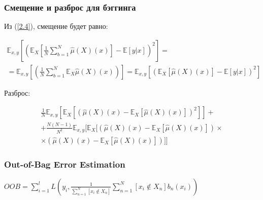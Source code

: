 \documentclass[fleqn,pdf, 9pt, usenames, dvipsnames, unicode, hyperref={bookmarks=true,bookmarksopen=false, bookmarksnumbered}]{beamer}
\begin{document}
\begin{frame}\frametitle{Смещение и разброс для бэггинга}

Из (\ref{2.4}), смещение будет равно:

\begin{multline}
	\mathbb{E}_{x,y}\left[\left(\mathbb{E}_X\left[\frac{1}{N}\sum_{b=1}^{N}\hat{\mu}(X)(x)\right]-\mathbb{E}[y|x]\right)^2\right] = \\ = \mathbb{E}_{x,y}\left[\left(\frac{1}{N}\sum_{b=1}^{N}\mathbb{E}_X\hat{\mu}(X)(x)\right)\right]  =\mathbb{E}_{x,y}\left[(\mathbb{E}_X\left[\hat{\mu}(X)(x)\right]-\mathbb{E}[y|x])^2\right]
\end{multline}

Разброс: 

\begin{multline}
	\frac{1}{N}\mathbb{E}_{x,y}\left[\mathbb{E}_X\left[\left(\hat{\mu}(X)(x)-\mathbb{E}_X[\hat{\mu}(X)(x)]\right)^2\right]\right] + \\ + 
	\frac{N(N-1)}{N^2}\mathbb{E}_{x,y}[\mathbb{E}_X[\left(\hat{\mu}(X)(x)-\mathbb{E}_X[\hat{\mu}(X)(x)]\right)\times \\ \times \left(\hat{\mu}(X)(x)-\mathbb{E}_X[\hat{\mu}(X)(x)]\right)]]
\end{multline}


\end{frame}


\begin{frame}\frametitle{Out-of-Bag Error Estimation}

$OOB = \sum_{i=1}^{l}L\left(y_i,\frac{1}{\sum_{n=1}^{N}\left[x_i \notin X_n\right]}\sum_{n=1}^{N}[x_i\notin X_n]b_n(x_i)\right)$

\end{frame}

\end{document}
